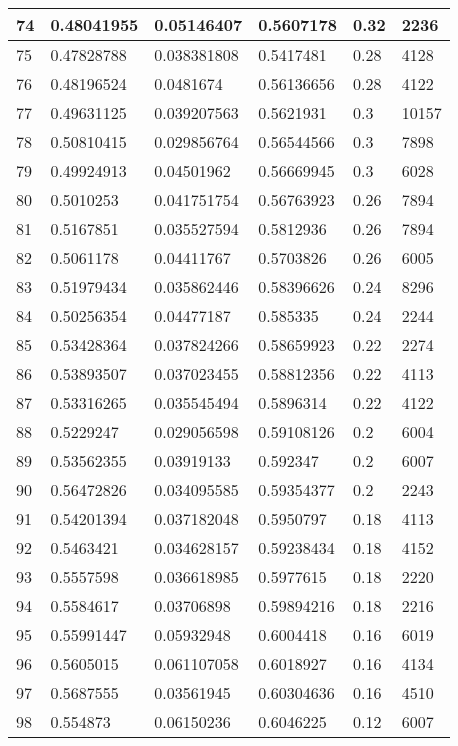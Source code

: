 \begin{longtable}{|l|l|l|l|l|l|}
74 & 0.48041955 & 0.05146407 & 0.5607178 & 0.32 & 2236 \\ \hline 
75 & 0.47828788 & 0.038381808 & 0.5417481 & 0.28 & 4128 \\ \hline 
76 & 0.48196524 & 0.0481674 & 0.56136656 & 0.28 & 4122 \\ \hline 
77 & 0.49631125 & 0.039207563 & 0.5621931 & 0.3 & 10157 \\ \hline 
78 & 0.50810415 & 0.029856764 & 0.56544566 & 0.3 & 7898 \\ \hline 
79 & 0.49924913 & 0.04501962 & 0.56669945 & 0.3 & 6028 \\ \hline 
80 & 0.5010253 & 0.041751754 & 0.56763923 & 0.26 & 7894 \\ \hline 
81 & 0.5167851 & 0.035527594 & 0.5812936 & 0.26 & 7894 \\ \hline 
82 & 0.5061178 & 0.04411767 & 0.5703826 & 0.26 & 6005 \\ \hline 
83 & 0.51979434 & 0.035862446 & 0.58396626 & 0.24 & 8296 \\ \hline 
84 & 0.50256354 & 0.04477187 & 0.585335 & 0.24 & 2244 \\ \hline 
85 & 0.53428364 & 0.037824266 & 0.58659923 & 0.22 & 2274 \\ \hline 
86 & 0.53893507 & 0.037023455 & 0.58812356 & 0.22 & 4113 \\ \hline 
87 & 0.53316265 & 0.035545494 & 0.5896314 & 0.22 & 4122 \\ \hline 
88 & 0.5229247 & 0.029056598 & 0.59108126 & 0.2 & 6004 \\ \hline 
89 & 0.53562355 & 0.03919133 & 0.592347 & 0.2 & 6007 \\ \hline 
90 & 0.56472826 & 0.034095585 & 0.59354377 & 0.2 & 2243 \\ \hline 
91 & 0.54201394 & 0.037182048 & 0.5950797 & 0.18 & 4113 \\ \hline 
92 & 0.5463421 & 0.034628157 & 0.59238434 & 0.18 & 4152 \\ \hline 
93 & 0.5557598 & 0.036618985 & 0.5977615 & 0.18 & 2220 \\ \hline 
94 & 0.5584617 & 0.03706898 & 0.59894216 & 0.18 & 2216 \\ \hline 
95 & 0.55991447 & 0.05932948 & 0.6004418 & 0.16 & 6019 \\ \hline 
96 & 0.5605015 & 0.061107058 & 0.6018927 & 0.16 & 4134 \\ \hline 
97 & 0.5687555 & 0.03561945 & 0.60304636 & 0.16 & 4510 \\ \hline 
98 & 0.554873 & 0.06150236 & 0.6046225 & 0.12 & 6007 \\ \hline 

\end{longtable}
